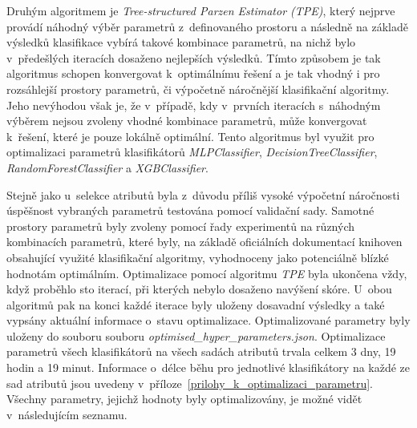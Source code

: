 Druhým algoritmem je \textit{Tree-structured Parzen Estimator (TPE)}, který nejprve provádí náhodný výběr parametrů z~definovaného prostoru a následně na základě výsledků klasifikace vybírá takové kombinace parametrů, na nichž bylo v~předešlých iteracích dosaženo nejlepších výsledků. Tímto způsobem je tak algoritmus schopen konvergovat k~optimálnímu řešení a je tak vhodný i pro rozsáhlejší prostory parametrů, či výpočetně náročnější klasifikační algoritmy. Jeho nevýhodou však je, že v~případě, kdy v~prvních iteracích s~náhodným výběrem nejsou zvoleny vhodné kombinace parametrů, může konvergovat k~řešení, které je pouze lokálně optimální. Tento algoritmus byl využit pro optimalizaci parametrů klasifikátorů \textit{MLPClassifier}, \textit{DecisionTreeClassifier}, \textit{RandomForestClassifier} a \textit{XGBClassifier}.

Stejně jako u~selekce atributů byla z~důvodu příliš vysoké výpočetní náročnosti úspěšnost vybraných parametrů testována pomocí validační sady. Samotné prostory parametrů byly zvoleny pomocí řady experimentů na různých kombinacích parametrů, které byly, na základě oficiálních dokumentací knihoven obsahující využité klasifikační algoritmy, vyhodnoceny jako potenciálně blízké hodnotám optimálním. Optimalizace pomocí algoritmu \textit{TPE} byla ukončena vždy, když proběhlo sto iterací, při kterých nebylo dosaženo navýšení skóre. U~obou algoritmů pak na konci každé iterace byly uloženy dosavadní výsledky a také vypsány aktuální informace o~stavu optimalizace. Optimalizované parametry byly uloženy do souboru souboru \textit{optimised\_hyper\_parameters.json}. Optimalizace parametrů všech klasifikátorů na všech sadách atributů trvala celkem 3 dny, 19 hodin a 19 minut.  Informace o~délce běhu pro jednotlivé klasifikátory na každé ze sad atributů jsou uvedeny v~příloze~\ref{prilohy_k_optimalizaci_parametru}. Všechny parametry, jejichž hodnoty byly optimalizovány, je možné vidět v~následujícím seznamu.

